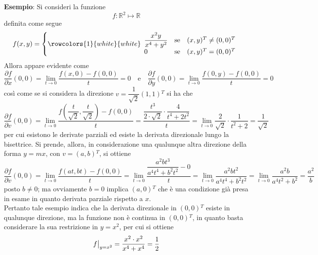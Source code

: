 \documentclass[a4paper]{extarticle}
\newcommand\restr[2]{{%
  \left.\kern-\nulldelimiterspace %
  #1 %
  \vphantom{\big|} %
  \right|_{#2} %
  }}
\begin{document}
\vspace{1em}
\noindent
\textbf{Esempio}: Si consideri la funzione
\[f:\mathbb{R}^2 \longmapsto \mathbb{R}\]
definita come segue
\[f(x,y) = \left\{
    \rowcolors{1}{white}{white}
    \begin{array}{lll}
        \dfrac{x^2y}{x^4+y^2} & \text{se} & (x,y){^T}\neq(0,0){^T}\\
        0 & \text{se} & (x,y){^T}=(0,0){^T}\\
    \end{array}
    \right.    
\]
Allora appare evidente come
\[\frac{\partial f}{\partial x}(0,0) = \lim_{t \to 0} \frac{f(x,0)-f(0,0)}{t} = 0 \hspace{1em} \text{e} \hspace{1em} \frac{\partial f}{\partial y}(0,0) = \lim_{t \to 0} \frac{f(0,y)-f(0,0)}{t} = 0\]
così come se si considera la direzione $v=\dfrac{1}{\sqrt{2}}(1,1){^T}$ si ha che
\[\frac{\partial f}{\partial v}(0,0) = \lim_{t \to 0} \frac{f\left(\dfrac{t}{\sqrt{2}},\dfrac{t}{\sqrt{2}}\right) - f(0,0)}{t} = \dfrac{\dfrac{t^3}{2\cdot\sqrt{2}} \cdot \dfrac{4}{t^4+2t^2}}{t} = \lim_{t \to 0} \frac{2}{\sqrt{2}} \cdot \frac{1}{t^2 + 2} = \frac{1}{\sqrt{2}}\]
per cui esistono le derivate parziali ed esiste la derivata direzionale lungo la bisettrice. Si prende, allora, in considerazione una qualunque altra direzione della forma $y=mx$, con $v=(a,b){^T}$, si ottiene
\[\frac{\partial f}{\partial v}(0,0) = \lim_{t \to 0} \frac{f(at,bt)-f(0,0)}{t} = \lim_{t \to 0} \dfrac{\dfrac{a^2bt^3}{a^4t^4+b^2t^2}-0}{t}=\lim_{t \to 0} \frac{a^2bt^2}{a^4t^4+b^2t^2} = \lim_{t \to 0} \frac{a^2b}{a^4t^2+b^2} = \frac{a^2}{b}\]
posto $b \neq 0$; ma ovviamente $b=0$ implica $(a,0){^T}$ che è una condizione già presa in esame in quanto derivata parziale rispetto a $x$.\\
Pertanto tale esempio indica che la derivata direzionale in $(0,0){^T}$ esiste in qualunque direzione, ma la funzione non è continua in $(0,0){^T}$, in quanto basta considerare la sua restrizione in $y=x^2$, per cui si ottiene 
\[\restr{f}{y=x^2}=\frac{x^2 \cdot x^2}{x^4 + x^4} = \frac{1}{2}\]
\end{document}
